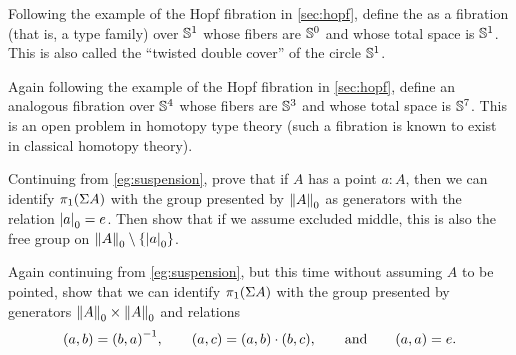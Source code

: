 \begin{ex}\label{ex:HopfJr}
  Following the example of the Hopf fibration in \autoref{sec:hopf}, define the 
as a fibration (that is, a type family) over $\Sn ^1$ whose fibers are $\Sn ^0$ and whose total space is $\Sn ^1$.  This is also called the ``twisted double cover'' of the circle $\Sn ^1$.
\end{ex}

\begin{ex}\label{ex:SuperHopf}
Again following the example of the Hopf fibration in \autoref{sec:hopf}, define an analogous fibration over $\Sn ^4$ whose fibers are $\Sn ^3$ and whose total space is $\Sn ^7$.  This is an open problem in homotopy type theory (such a fibration is known to exist in classical homotopy theory).
\end{ex}

\begin{ex}\label{ex:vksusppt}
  Continuing from \autoref{eg:suspension}, prove that if $A$ has a point $a:A$, then we can identify $\pi_1(\susp A)$ with the group presented by $\trunc0A$ as generators with the relation $\tproj0a = e$.
  Then show that if we assume excluded middle, this is also the free group on $\trunc0 A \setminus \{\tproj0 a \}$.
\end{ex}

\begin{ex}\label{ex:vksuspnopt}
  Again continuing from \autoref{eg:suspension}, but this time without assuming $A$ to be pointed, show that we can identify $\pi_1(\susp A)$ with the group presented by generators $\trunc0A \times \trunc0A$ and relations
  \begin{equation*}
    (a,b) = \opp{(b,a)},
    \qquad
    (a,c) = (a,b)\cdot (b,c),
    \qquad\text{and}\qquad
    (a,a) = e.
  \end{equation*}
\end{ex}


